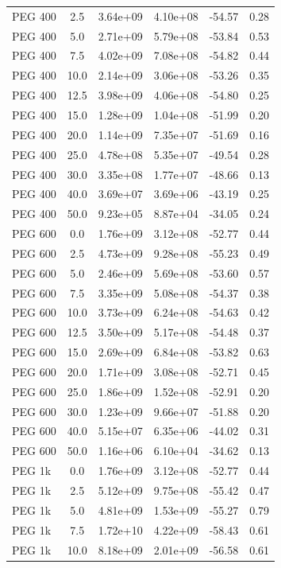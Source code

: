 \begin{tabular}{lccccc}
PEG 400 & 2.5 & 3.64e+09 & 4.10e+08 & -54.57 & 0.28 \\
PEG 400 & 5.0 & 2.71e+09 & 5.79e+08 & -53.84 & 0.53 \\
PEG 400 & 7.5 & 4.02e+09 & 7.08e+08 & -54.82 & 0.44 \\
PEG 400 & 10.0 & 2.14e+09 & 3.06e+08 & -53.26 & 0.35 \\
PEG 400 & 12.5 & 3.98e+09 & 4.06e+08 & -54.80 & 0.25 \\
PEG 400 & 15.0 & 1.28e+09 & 1.04e+08 & -51.99 & 0.20 \\
PEG 400 & 20.0 & 1.14e+09 & 7.35e+07 & -51.69 & 0.16 \\
PEG 400 & 25.0 & 4.78e+08 & 5.35e+07 & -49.54 & 0.28 \\
PEG 400 & 30.0 & 3.35e+08 & 1.77e+07 & -48.66 & 0.13 \\
PEG 400 & 40.0 & 3.69e+07 & 3.69e+06 & -43.19 & 0.25 \\
PEG 400 & 50.0 & 9.23e+05 & 8.87e+04 & -34.05 & 0.24 \\
PEG 600 & 0.0 & 1.76e+09 & 3.12e+08 & -52.77 & 0.44 \\
PEG 600 & 2.5 & 4.73e+09 & 9.28e+08 & -55.23 & 0.49 \\
PEG 600 & 5.0 & 2.46e+09 & 5.69e+08 & -53.60 & 0.57 \\
PEG 600 & 7.5 & 3.35e+09 & 5.08e+08 & -54.37 & 0.38 \\
PEG 600 & 10.0 & 3.73e+09 & 6.24e+08 & -54.63 & 0.42 \\
PEG 600 & 12.5 & 3.50e+09 & 5.17e+08 & -54.48 & 0.37 \\
PEG 600 & 15.0 & 2.69e+09 & 6.84e+08 & -53.82 & 0.63 \\
PEG 600 & 20.0 & 1.71e+09 & 3.08e+08 & -52.71 & 0.45 \\
PEG 600 & 25.0 & 1.86e+09 & 1.52e+08 & -52.91 & 0.20 \\
PEG 600 & 30.0 & 1.23e+09 & 9.66e+07 & -51.88 & 0.20 \\
PEG 600 & 40.0 & 5.15e+07 & 6.35e+06 & -44.02 & 0.31 \\
PEG 600 & 50.0 & 1.16e+06 & 6.10e+04 & -34.62 & 0.13 \\
PEG 1k & 0.0 & 1.76e+09 & 3.12e+08 & -52.77 & 0.44 \\
PEG 1k & 2.5 & 5.12e+09 & 9.75e+08 & -55.42 & 0.47 \\
PEG 1k & 5.0 & 4.81e+09 & 1.53e+09 & -55.27 & 0.79 \\
PEG 1k & 7.5 & 1.72e+10 & 4.22e+09 & -58.43 & 0.61 \\
PEG 1k & 10.0 & 8.18e+09 & 2.01e+09 & -56.58 & 0.61 \\

\end{tabular}

